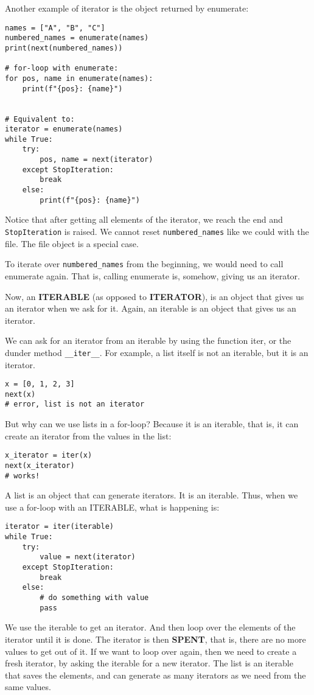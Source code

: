 \documentclass[12pt, a4paper]{article}
\begin{document}
Another example of iterator is the object returned by enumerate:
\lstset{language=jupyter-python,label= ,caption= ,captionpos=b,numbers=none}
\begin{lstlisting}
names = ["A", "B", "C"]
numbered_names = enumerate(names)
print(next(numbered_names))

# for-loop with enumerate:
for pos, name in enumerate(names):
    print(f"{pos}: {name}")


# Equivalent to:
iterator = enumerate(names)
while True:
    try:
        pos, name = next(iterator)
    except StopIteration:
        break
    else:
        print(f"{pos}: {name}")
\end{lstlisting}

Notice that after getting all elements of the iterator, we reach the end and \texttt{StopIteration} is raised.
We cannot reset \texttt{numbered\_names} like we could with the file.
The file object is a special case.

To iterate over \texttt{numbered\_names} from the beginning, we would need to call enumerate again.
That is, calling enumerate is, somehow, giving us an iterator.

Now, an \textbf{\textbf{ITERABLE}} (as opposed to \textbf{\textbf{ITERATOR}}), is an object that gives us an iterator when we ask for it.
Again, an iterable is an object that gives us an iterator.

We can ask for an iterator from an iterable by using the function iter, or the dunder method \texttt{\_\_iter\_\_}.
For example, a list itself is not an iterable, but it is an iterator.
\lstset{language=jupyter-python,label= ,caption= ,captionpos=b,numbers=none}
\begin{lstlisting}
x = [0, 1, 2, 3]
next(x)
# error, list is not an iterator
\end{lstlisting}

But why can we use lists in a for-loop?
Because it is an iterable, that is, it can create an iterator from the values in the list:
\lstset{language=jupyter-python,label= ,caption= ,captionpos=b,numbers=none}
\begin{lstlisting}
x_iterator = iter(x)
next(x_iterator)
# works!
\end{lstlisting}

A list is an object that can generate iterators. It is an iterable.
Thus, when we use a for-loop with an ITERABLE, what is happening is:
\lstset{language=jupyter-python,label= ,caption= ,captionpos=b,numbers=none}
\begin{lstlisting}
iterator = iter(iterable)
while True:
    try:
        value = next(iterator)
    except StopIteration:
        break
    else:
        # do something with value
        pass
\end{lstlisting}
We use the iterable to get an iterator.
And then loop over the elements of the iterator until it is done.
The iterator is then \textbf{\textbf{SPENT}}, that is, there are no more values to get out of it.
If we want to loop over again, then we need to create a fresh iterator, by asking the iterable for a new iterator.
The list is an iterable that saves the elements, and can generate as many iterators as we need from the same values.
\end{document}
